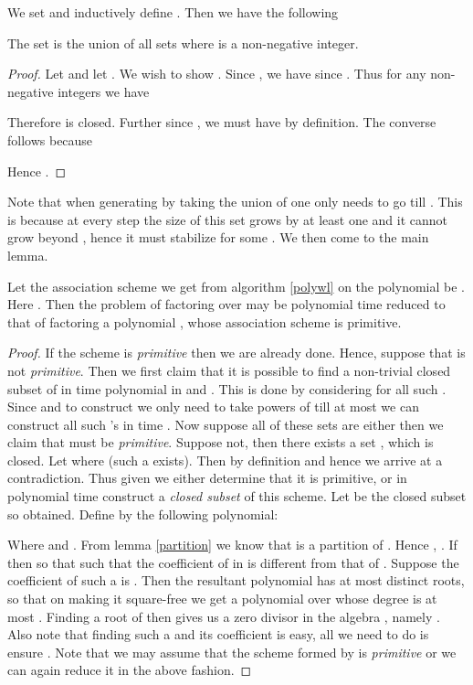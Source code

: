 	We set  and inductively define . Then we have the following

	\begin{lemma}
		The set  is the union of all sets  where  is a non-negative integer.
	\end{lemma}

	\begin{proof}
		Let  and let . We wish to show . Since , we have  since . Thus for any non-negative integers  we have

		

		Therefore  is closed. Further since , we must have  by definition. The converse follows because

		

		Hence .
	\end{proof}

	Note that when generating  by taking the union of  one only needs to go till . This is because at every step the size of this set grows by at least one and it cannot grow beyond
	, hence it must stabilize for some . We then come to the main lemma.

	\begin{theorem}\label{primitive}
		Let the association scheme we get from algorithm \ref{polywl} on the polynomial  be . Here . Then the problem of factoring  over  may be 
		polynomial time reduced	to that of factoring a polynomial ,  whose association scheme  is primitive.
	\end{theorem}

	\begin{proof}If the scheme  is \emph{primitive} then we are already done. Hence, suppose that  is not \emph{primitive}. Then we first claim that it is possible to find a non-trivial closed
		subset of  in time polynomial in  and . This is done by considering  for all such . Since  and to construct  we only need to take powers
		of  till at most  we can construct all such 's in time . Now suppose all of these sets are either  then we claim that  must be \emph{primitive}.
		Suppose not, then there exists a set ,  which is closed. Let  where  (such a  exists). Then by definition
		 and hence we arrive at a contradiction. Thus given  we either determine that it is primitive, or in polynomial time construct a \emph{closed
		subset} of this scheme. Let  be the closed subset so obtained. Define by  the following polynomial:

		

		Where  and . From lemma \ref{partition} we know that  is a partition of . Hence , 
		. If  then  so that  such that the coefficient of  in
		 is different from that of . Suppose the coefficient of such a  is . Then the resultant polynomial  has
		at most  distinct roots, so that on making it square-free we get a polynomial  over  whose degree is at most . Finding a root  of  then gives us a zero
		divisor in the algebra , namely . Also note that finding such a  and its coefficient is easy, all we need to do is ensure . Note that we may assume that
		the scheme  formed by  is \emph{primitive} or we can again reduce it in the above fashion.
	\end{proof}
	
